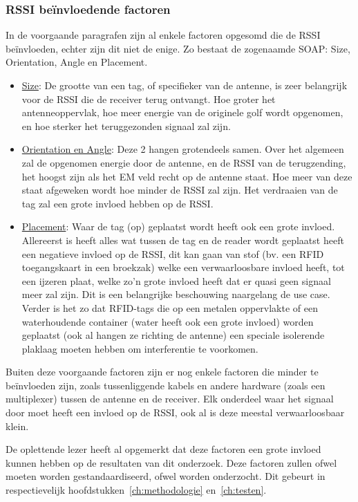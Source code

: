 \subsubsection{RSSI beïnvloedende factoren}
In de voorgaande paragrafen zijn al enkele factoren opgesomd die de RSSI beïnvloeden, echter zijn dit niet de enige. Zo bestaat de zogenaamde SOAP: Size, Orientation, Angle en Placement.
\begin{itemize}
	\item \underline{Size}:
	De grootte van een tag, of specifieker van de antenne, is zeer belangrijk voor de RSSI die de receiver terug ontvangt. Hoe groter het antenneoppervlak, hoe meer energie van de originele golf wordt opgenomen, en hoe sterker het teruggezonden signaal zal zijn.
	\item \underline{Orientation en Angle}:
	Deze 2 hangen grotendeels samen. Over het algemeen zal de opgenomen energie door de antenne, en de RSSI van de terugzending, het hoogst zijn als het EM veld recht op de antenne staat. Hoe meer van deze staat afgeweken wordt hoe minder de RSSI zal zijn. Het verdraaien van de tag zal een grote invloed hebben op de RSSI. 
	\item \underline{Placement}:
	Waar de tag (op) geplaatst wordt heeft ook een grote invloed. Allereerst is heeft alles wat tussen de tag en de reader wordt geplaatst heeft een negatieve invloed op de RSSI, dit kan gaan van stof (bv. een RFID toegangskaart in een broekzak) welke een verwaarloosbare invloed heeft, tot een ijzeren plaat, welke zo'n grote invloed heeft dat er quasi geen signaal meer zal zijn. Dit is een belangrijke beschouwing naargelang de use case. Verder is het zo dat RFID-tags die op een metalen oppervlakte of een waterhoudende container (water heeft ook een grote invloed) worden geplaatst (ook al hangen ze richting de antenne) een speciale isolerende plaklaag moeten hebben om interferentie te voorkomen.
\end{itemize}

Buiten deze voorgaande factoren zijn er nog enkele factoren die minder te beïnvloeden zijn, zoals tussenliggende kabels en andere hardware (zoals een multiplexer) tussen de antenne en de receiver. Elk onderdeel waar het signaal door moet heeft een invloed op de RSSI, ook al is deze meestal verwaarloosbaar klein.\autocite{Armstrong2013}

De oplettende lezer heeft al opgemerkt dat deze factoren een grote invloed kunnen hebben op de resultaten van dit onderzoek. Deze factoren zullen ofwel moeten worden gestandaardiseerd, ofwel worden onderzocht. Dit gebeurt in respectievelijk hoofdstukken~\ref{ch:methodologie} en~\ref{ch:testen}.

